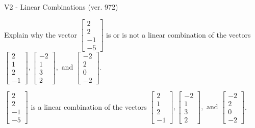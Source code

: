 \begin{exercise}
  \begin{exerciseTitle}V2 - Linear Combinations (ver. 972)\end{exerciseTitle}
  \begin{exerciseStatement}
    Explain why the vector \(\left[\begin{array}{c}
2 \\
2 \\
-1 \\
-5
\end{array}\right]\)  is or is not a linear 
	combination of the vectors \(\left[\begin{array}{c}
2 \\
1 \\
2 \\
-1
\end{array}\right] , \left[\begin{array}{c}
-2 \\
1 \\
3 \\
2
\end{array}\right] , \text{ and } \left[\begin{array}{c}
-2 \\
2 \\
0 \\
-2
\end{array}\right]\).
	


  \end{exerciseStatement}
  \begin{exerciseAnswer}
   \(\left[\begin{array}{c}
2 \\
2 \\
-1 \\
-5
\end{array}\right]\) 
  	 is  
	a linear combination of the vectors \(\left[\begin{array}{c}
2 \\
1 \\
2 \\
-1
\end{array}\right] , \left[\begin{array}{c}
-2 \\
1 \\
3 \\
2
\end{array}\right] , \text{ and } \left[\begin{array}{c}
-2 \\
2 \\
0 \\
-2
\end{array}\right]\).

	
  


  \end{exerciseAnswer}
\end{exercise}